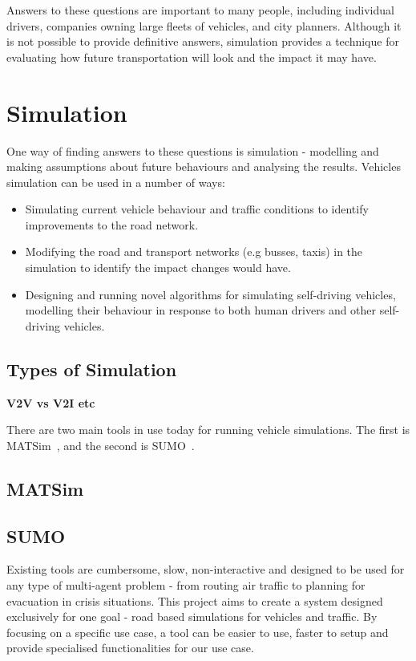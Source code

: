 \documentclass[ %
                    author={Alexander Hill},
                supervisor={Dr. Benjamin Sach},
                    degree={MEng},
                     title={MARMOSET},
                  subtitle={Multi-Agent Route Management using Online Simulation for Efficient Transportation},
                      type={research},
                      year={2016} ]{dissertation}
\begin{document}
Answers to these questions are important to many people, including individual
drivers, companies owning large fleets of vehicles, and city planners. Although
it is not possible to provide definitive answers, simulation provides a
technique for evaluating how future transportation will look and the impact it
may have.

\section{Simulation}

One way of finding answers to these questions is simulation - modelling and
making assumptions about future behaviours and analysing the results. Vehicles
simulation can be used in a number of ways:

\begin{itemize}
    \item Simulating current vehicle behaviour and traffic conditions to
        identify improvements to the road network.
    \item Modifying the road and transport networks (e.g busses, taxis) in the
        simulation to identify the impact changes would have.
    \item Designing and running novel algorithms for simulating self-driving
        vehicles, modelling their behaviour in response to both human drivers
        and other self-driving vehicles.
\end{itemize}

\subsection{Types of Simulation}

\textbf{V2V vs V2I etc}

There are two main tools in use today for running vehicle simulations. The first
is MATSim~\cite{matsim}, and the second is SUMO~\cite{sumo}.

\subsection{MATSim}

\subsection{SUMO}

Existing tools are cumbersome, slow, non-interactive and designed to be used for
any type of multi-agent problem - from routing air traffic to planning for
evacuation in crisis situations. This project aims to create a system designed
exclusively for one goal - road based simulations for vehicles and traffic.  By
focusing on a specific use case, a tool can be easier to use, faster to setup
and provide specialised functionalities for our use case.
\end{document}
